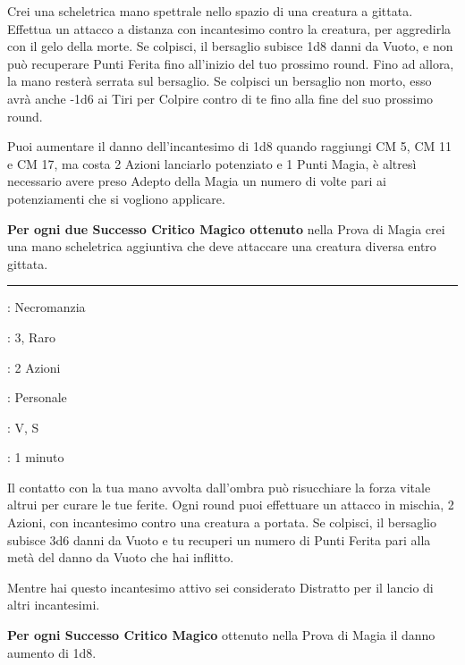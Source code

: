 \begin{multicols}{2}
Crei una scheletrica mano spettrale nello spazio di una creatura a gittata. Effettua un attacco a distanza con incantesimo contro la creatura, per aggredirla con il gelo della morte. Se colpisci, il bersaglio subisce 1d8 danni da Vuoto, e non può recuperare Punti Ferita fino all'inizio del tuo prossimo round. Fino ad allora, la mano resterà serrata sul bersaglio. Se colpisci un bersaglio non morto, esso avrà anche -1d6 ai Tiri per Colpire contro di te fino alla fine del suo prossimo round.

Puoi aumentare il danno dell'incantesimo di 1d8 quando raggiungi CM 5, CM 11 e CM 17, ma costa 2 Azioni lanciarlo potenziato e 1 Punti Magia, è altresì necessario avere preso Adepto della Magia un numero di volte pari ai potenziamenti che si vogliono applicare.

\textbf{Per ogni due Successo Critico Magico ottenuto} nella Prova di Magia crei una mano scheletrica aggiuntiva che deve attaccare una creatura diversa entro gittata.

\smallskip\noindent\rule{\linewidth}{2pt} \hypertarget{Tocco Vampirico}{}\smallskip{}
\noindent
\begin{description}[noitemsep, topsep=0pt, parsep=0pt, partopsep=0pt, leftmargin=0cm, labelwidth=2.8cm]
	\item[\textbf{Lista di Magia}]: Necromanzia
	\item[\textbf{Livello}]: 3, Raro
	\item[\textbf{T. di Lancio}]: 2 Azioni
	\item[\textbf{Gittata}]: Personale
	\item[\textbf{Componenti}]: V, S
	\item[\textbf{Durata}]: 1 minuto
\end{description}

Il contatto con la tua mano avvolta dall'ombra può risucchiare la forza vitale altrui per curare le tue ferite. Ogni round puoi effettuare un attacco in mischia, 2 Azioni, con incantesimo contro una creatura a portata. Se colpisci, il bersaglio subisce 3d6 danni da Vuoto e tu recuperi un numero di Punti Ferita pari alla metà del danno da Vuoto che hai inflitto.

Mentre hai questo incantesimo attivo sei considerato Distratto per il lancio di altri incantesimi.

\textbf{Per ogni Successo Critico Magico} ottenuto nella Prova di Magia il danno aumento di 1d8.


\end{multicols}
